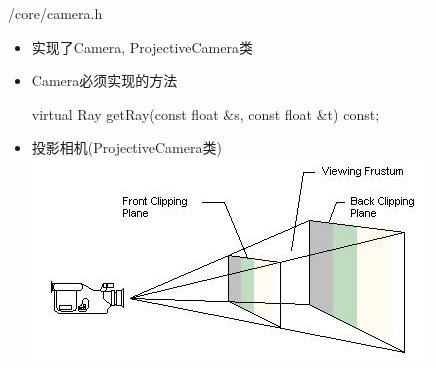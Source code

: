 \documentclass{beamer}
\begin{document}
\begin{frame} {/core/camera.h}
\begin{itemize} [<+->]
\item 实现了Camera, ProjectiveCamera类
\item Camera必须实现的方法
\begin{semiverbatim} virtual Ray getRay(const float \&s, const float \&t) const; \end{semiverbatim}
\item 投影相机(ProjectiveCamera类)
\includegraphics[scale=1]{projectivecamera.jpg}
\end{itemize}
\end{frame}
\end{document}
